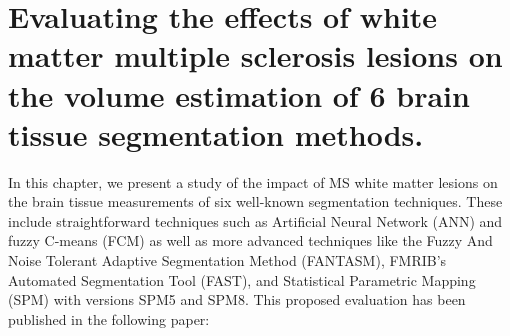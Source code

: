 
\chapter{Evaluating the effects of white matter multiple sclerosis lesions on the volume estimation of 6 brain tissue segmentation
methods.}  
\label{chapter:chapter_3}
In this chapter, we present a study of the impact of MS white matter lesions on the brain tissue measurements of six well-known segmentation techniques. These include straightforward techniques such as Artificial Neural Network (ANN) and fuzzy C-means (FCM) as well as more advanced techniques like the Fuzzy And Noise Tolerant Adaptive Segmentation Method (FANTASM), FMRIB's Automated Segmentation Tool (FAST), and Statistical Parametric Mapping (SPM) with versions SPM5 and SPM8. This proposed evaluation has been published in the following paper:

\vspace{2cm}

\noindent{}





